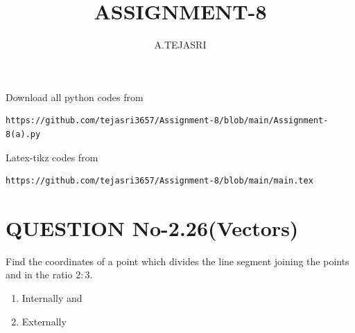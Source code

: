 \documentclass[journal,12pt,twocolumn]{IEEEtran}
\begin{document}
     \def\rightbox#1{\makebox[0in][r]{#1}}
     \def\centbox#1{\makebox[0in]{#1}}
     \def\topbox#1{\raisebox{-\baselineskip}[0in][0in]{#1}}
     \def\midbox#1{\raisebox{-0.5\baselineskip}[0in][0in]{#1}}
\vspace{3cm}
\title{ASSIGNMENT-8}
\author{A.TEJASRI}
\maketitle
\newpage
\bigskip
\renewcommand{\thefigure}{\theenumi}
\renewcommand{\thetable}{\theenumi}
%
Download all python codes from 
\begin{lstlisting}
https://github.com/tejasri3657/Assignment-8/blob/main/Assignment-8(a).py
\end{lstlisting}
%
Latex-tikz codes from 
%
\begin{lstlisting}
https://github.com/tejasri3657/Assignment-8/blob/main/main.tex
\end{lstlisting}
%
\section{QUESTION No-2.26(Vectors)}
Find the coordinates of a point which divides the line segment joining the points  and  in the ratio $2:3$.
\begin{enumerate}
\item Internally and 
\item Externally
\end{enumerate}
\end{document}
